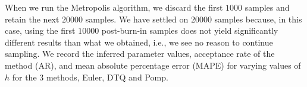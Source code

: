 \documentclass[graybox]{svmult}
\begin{document}
When we run the Metropolis algorithm, we discard the first $1000$ samples and retain the next $20000$ samples.  We have settled on $20000$ samples because, in this case, using the first $10000$ post-burn-in samples does not yield significantly different results than what we obtained, i.e., we see no reason to continue sampling.  We record the inferred parameter values, acceptance rate of the method (AR), and mean absolute percentage error (MAPE) for varying values of $h$ for the 3 methods, Euler, DTQ and Pomp.
\vspace{-4mm}
\end{document}

